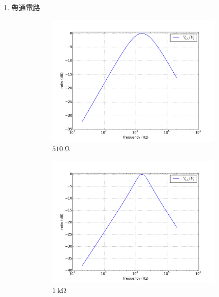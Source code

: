 \documentclass[12pt, a4paper]{article}
\begin{document}
\begin{enumerate}[itemsep=20pt, topsep=10pt]
\begin{enumerate}[label=(\alph*)]
      \item 帶通電路  \begin{figure}[H]
        \centering
        \begin{subfigure}[b]{0.45\textwidth}
          \includegraphics[width=1\textwidth]{circuit/p31.pdf}
          \caption{$\SI{510}\ohm$}
        \end{subfigure}
        \begin{subfigure}[b]{0.45\textwidth}
          \includegraphics[width=1\textwidth]{circuit/p32.pdf}
          \caption{$\SI{1}\kohm$}
        \end{subfigure}
        \begin{subfigure}[b]{0.45\textwidth}

\end{subfigure}
\end{figure}
\end{enumerate}
\end{enumerate}
\end{document}
